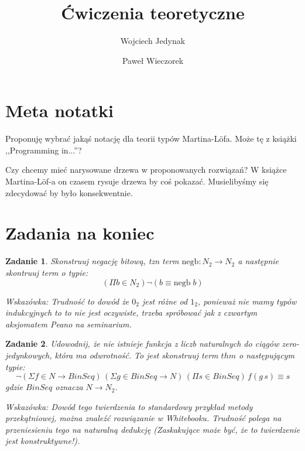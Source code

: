 \documentclass[10pt, a4paper]{article}
\author{Wojciech Jedynak \and Paweł Wieczorek}
\title{Ćwiczenia teoretyczne}
\newtheorem{zadanie}{Zadanie}
\begin{document}
\maketitle

\section*{Meta notatki}

Proponuję wybrać jakąś notację dla teorii typów Martina-L\"{o}fa. Może tę z książki ,,Programming in...''?

Czy chcemy mieć narysowane drzewa w proponowanych rozwiązań? W książce Martina-L\"{o}f-a on czasem rysuje drzewa
by coś pokazać. Musielibyśmy się zdecydować by było konsekwentnie.


\section{Zadania na koniec}


\begin{zadanie}
 Skonstruuj negację bitową, tzn term $\mbox{negb} : N_2 \to N_2$ a następnie skontruuj term o typie:
\[
 (\Pi b \in N_2) \neg (b \equiv \mbox{negb}\;b)
\]

Wskazówka: Trudność to dowód że $0_2$ jest różne od $1_2$, ponieważ nie mamy typów indukcyjnych to to nie jest
oczywiste, trzeba spróbować jak z czwartym aksjomatem Peano  na seminarium.
\end{zadanie}

\begin{zadanie}
 Udowodnij, że nie istnieje funkcja z liczb naturalnych do ciągów zero-jedynkowych, która ma odwrotność.
To jest skonstruuj
 term $thm$ o następującym typie:
\[
 \neg (\Sigma f \in N \to BinSeq)\, (\Sigma g \in BinSeq \to N)\,
(\Pi s \in BinSeq)\,f (g\, s) \equiv s 
\]
gdzie $BinSeq$ oznacza $N \to N_2$.

Wskazówka: Dowód tego twierdzenia to standardowy przykład metody przekątniowej, można znaleźć rozwiązanie w Whitebooku.
Trudność polega na przeniesieniu tego na naturalną dedukcję (Zaskakujące może być, że to twierdzenie jest konstruktywne!).

\end{zadanie}
\end{document}
